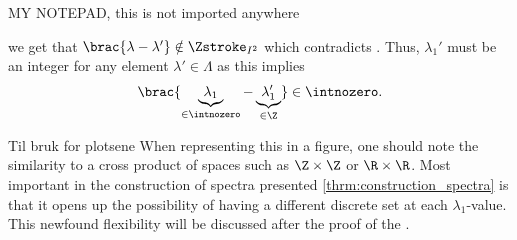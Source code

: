 


MY NOTEPAD, this is not imported anywhere



we get that $\brac{\lambda-\lambda'} \notin \Zstroke_{I^2}$ which contradicts . Thus, $\lambda_1'$ must be an integer for any element $\lambda'\in \Lambda$ as this implies
\begin{align*}  %
    \brac{\underbrace{\lambda_1}_{\in \intnozero}-\underbrace{\lambda_1'}_{\in \Z}} \in \intnozero. %
\end{align*}




Til bruk for plotsene
When representing this in a figure, one should note the similarity to a cross product of spaces such as $\Z \times \Z$ or $\R \times \R$. Most important in the construction of spectra presented \cref{thrm:construction_spectra} is that it opens up the possibility of having a different discrete set at each $\lambda_1$-value. This newfound flexibility will be discussed after the proof of the .






